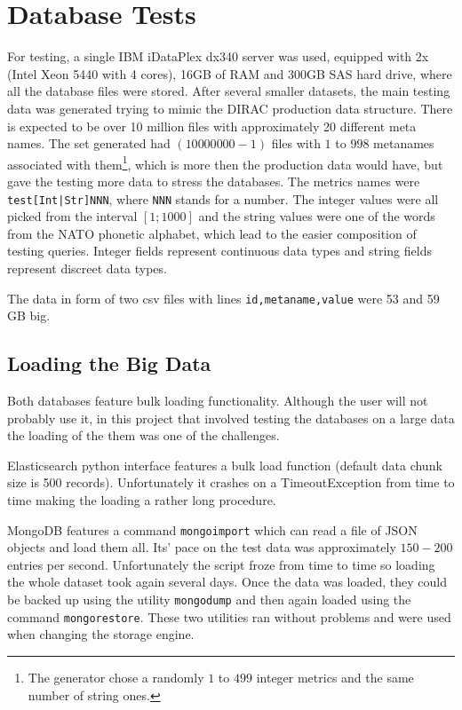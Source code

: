
\section{Database Tests}

For testing, a single IBM iDataPlex dx340 server was used, equipped with 2x (Intel Xeon 5440 with 4 cores), 16GB
of RAM and 300GB SAS hard drive, where all the database files were stored. After several smaller datasets, 
the main testing data was generated trying to mimic the DIRAC production data structure. There is expected to
be over 10 million files with approximately 20 different meta names.
The set generated had $(10 000 000 - 1)$ files with $1$ to $998$ metanames associated with them\footnote{ 
The generator chose a randomly $1$ to $499$ integer metrics and the same number of string ones.}, which is more
then the production data would have, but gave the testing more data to stress the databases.
The metrics names were \texttt{test[Int|Str]NNN}, where \texttt{NNN} stands for a number. The
integer values were all picked from the interval $[1;1000]$ and the string values were one of the
words from the NATO phonetic alphabet\cite{NATO}, which lead to the easier composition of testing queries. 
Integer fields represent continuous data types and string fields represent discreet data types.

The data in form of two csv files with lines \texttt{id,metaname,value} were 53 and 59 GB big.

\subsection{Loading the Big Data}

Both databases feature bulk loading functionality. Although the user will not probably use it, in
this project that involved testing the databases on a large data the loading of the them was one 
of the challenges.

Elasticsearch python interface features a bulk load function (default data chunk size is 500 records). 
Unfortunately it crashes on a TimeoutException from time to time making the loading a rather long procedure. 

MongoDB features a command \texttt{mongoimport} which can read a file of JSON objects and load
them all. Its' pace on the test data was approximately $150-200$ entries per second. Unfortunately 
the script froze from time to time so loading the whole dataset took again several days. Once the data was
loaded, they could be backed up using the utility \texttt{mongodump} and then again loaded using the 
command \texttt{mongorestore}. These two utilities ran without problems and were used when changing the 
storage engine.

